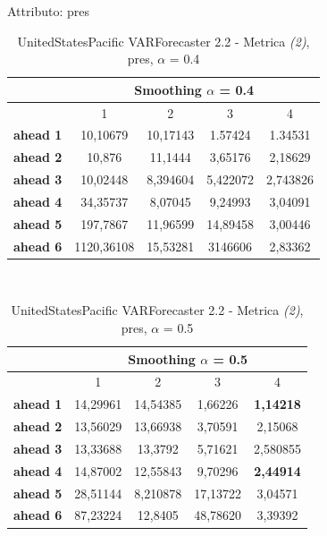 \documentclass[12pt,a4paper,oneside,openright]{book}
\begin{document}
\medskip

Attributo: pres \\ 

\begin{table}[H]
\centering
\begin{tabular}{|c|c|c|c|c|}
\hline
 & \multicolumn{4}{|c|}{Smoothing $\alpha$ = 0.4} \\
\hline
& 1 & 2 & 3 & 4 \\
\hline
\textbf{ahead 1} & 10,10679 & 10,17143 & 1.57424 & 1.34531\\
\hline
\textbf{ahead 2} & 10,876 & 11,1444 & 3,65176 &2,18629 \\ 
\hline
\textbf{ahead 3} & 10,02448 & 8,394604 & 5,422072 & 2,743826 \\
\hline
\textbf{ahead 4} & 34,35737 & 8,07045 & 9,24993 & 3,04091\\ 
\hline
\textbf{ahead 5} & 197,7867 & 11,96599 & 14,89458 & 3,00446\\
\hline
\textbf{ahead 6} & 1120,36108 & 15,53281 & 3146606 & 2,83362\\ 
\hline
\end{tabular} \\
\caption{UnitedStatesPacific VARForecaster 2.2 - Metrica \textit{(2)}, pres, $\alpha$ = 0.4}
\end{table} 

\medskip

\begin{table}[H]
\centering
\begin{tabular}{|c|c|c|c|c|}
\hline
 & \multicolumn{4}{|c|}{Smoothing $\alpha$ = 0.5} \\
\hline
& 1 & 2 & 3 & 4 \\
\hline
\textbf{ahead 1} & 14,29961 & 14,54385 & 1,66226 & \textbf{1,14218} \\
\hline
\textbf{ahead 2} & 13,56029 & 13,66938 & 3,70591 & 2,15068 \\ 
\hline
\textbf{ahead 3} & 13,33688 & 13,3792 & 5,71621 & 2,580855 \\
\hline
\textbf{ahead 4} & 14,87002 & 12,55843 & 9,70296 & \textbf{2,44914}\\ 
\hline
\textbf{ahead 5} & 28,51144 & 8,210878 & 17,13722 & 3,04571\\
\hline
\textbf{ahead 6} & 87,23224 & 12,8405 & 48,78620 & 3,39392\\ 
\hline
\end{tabular} \\
\caption{UnitedStatesPacific VARForecaster 2.2 - Metrica \textit{(2)}, pres, $\alpha$ = 0.5}
\end{table}
\end{document}
